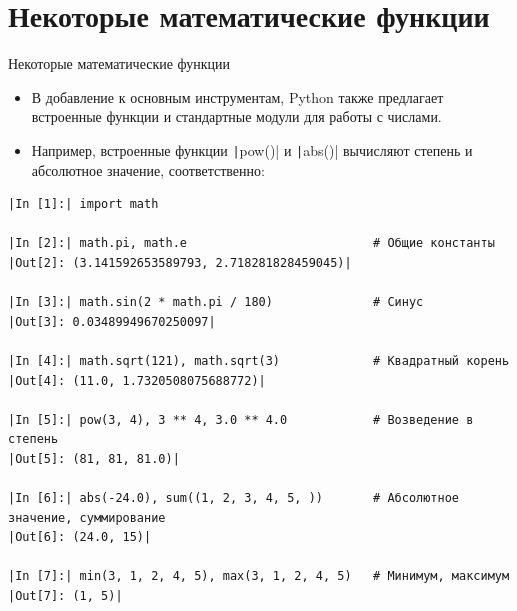 \documentclass[aspectratio=169, mathserif]{beamer}	%
\begin{document}
\section{Некоторые математические функции}
\sectionframe

\begin{frame}[fragile]{Некоторые математические функции}
\scriptsize
\begin{itemize}
	\item В добавление к основным инструментам, Python также предлагает встроенные функции и стандартные модули для работы с числами.
	\item Например, встроенные функции \texttt|pow()| и \texttt|abs()| вычисляют степень и абсолютное значение, соответственно:
\end{itemize}
\begin{verbatim}
|In [1]:| import math

|In [2]:| math.pi, math.e                          # Общие константы
|Out[2]: (3.141592653589793, 2.718281828459045)|

|In [3]:| math.sin(2 * math.pi / 180)              # Синус
|Out[3]: 0.03489949670250097|

|In [4]:| math.sqrt(121), math.sqrt(3)             # Квадратный корень
|Out[4]: (11.0, 1.7320508075688772)|

|In [5]:| pow(3, 4), 3 ** 4, 3.0 ** 4.0            # Возведение в степень
|Out[5]: (81, 81, 81.0)|

|In [6]:| abs(-24.0), sum((1, 2, 3, 4, 5, ))       # Абсолютное значение, суммирование
|Out[6]: (24.0, 15)|

|In [7]:| min(3, 1, 2, 4, 5), max(3, 1, 2, 4, 5)   # Минимум, максимум
|Out[7]: (1, 5)|
\end{verbatim}
\vfill
\end{frame}
\end{document}
